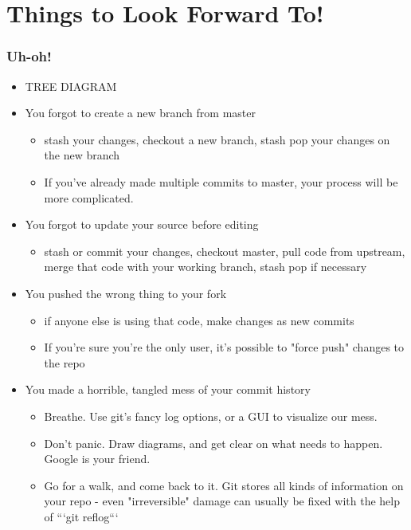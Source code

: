 \documentclass[unknownkeysallowed]{beamer}
\begin{document}
\section{Things to Look Forward To!}
\begin{frame}
    \frametitle{Uh-oh!}
    \begin{itemize}
        \item{TREE DIAGRAM}
        \item{You forgot to create a new branch from master}
        \begin{itemize}
            \item{stash your changes, checkout a new branch, stash pop your changes on the new branch}
            \item{If you've already made multiple commits to master, your process will be more complicated.}
        \end{itemize}
        \item{You forgot to update your source before editing}
        \begin{itemize}
            \item{stash or commit your changes, checkout master, pull code from upstream, merge that code with your working branch, stash pop if necessary}
        \end{itemize}
        \item{You pushed the wrong thing to your fork}
        \begin{itemize}
            \item{if anyone else is using that code, make changes as new commits}
            \item{If you're sure you're the only user, it's possible to "force push" changes to the repo}
        \end{itemize}
        \item{You made a horrible, tangled mess of your commit history}
        \begin{itemize}
            \item{Breathe. Use git's fancy log options, or a GUI to visualize our mess.}
            \item{Don't panic. Draw diagrams, and get clear on what needs to happen. Google is your friend.}
            \item{Go for a walk, and come back to it. Git stores all kinds of information on your repo - even "irreversible" damage can usually be fixed with the help of ```git reflog```}
        \end{itemize}
    \end{itemize}
    \vspace{1cm} %
\end{frame}
\end{document}
